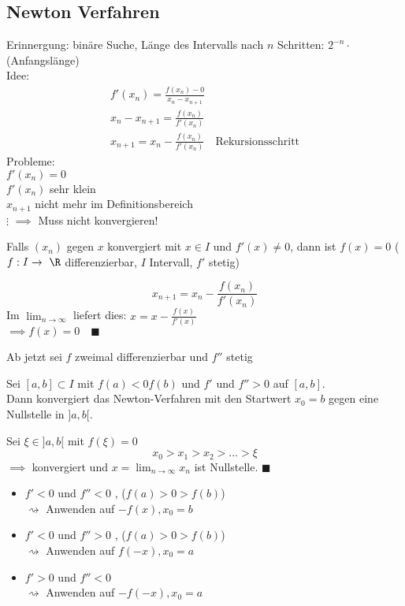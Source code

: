 \subsection{Newton Verfahren}
Erinnergung: binäre Suche, Länge des Intervalls nach $n$ Schritten: $2^{-n} \cdot$ (Anfangslänge)\\
Idee:
\begin{gather*}
	f'(x_n) = \frac{f(x_n) - 0}{x_n - x_{n+1}} \\
	x_n - x_{n+1} = \frac{f(x_n)}{f'(x_n)} \\
	x_{n+1} = x_n - \frac{f(x_n)}{f'(x_n)} \quad \text{Rekursionsschritt}
\end{gather*}
Probleme: \\
$f'(x_n) = 0$ \\
$f'(x_n)$ sehr klein \\
$x_{n+1}$ nicht mehr im Definitionsbereich \\
$\vdots$
$\implies$ Muss nicht konvergieren! \\
\begin{beh}
	Falls $(x_n)$ gegen $x$ konvergiert mit $x \in I$ und $f'(x) \neq 0$, dann ist $f(x) = 0$ ($f: I \rightarrow \R$ differenzierbar, $I$ Intervall, $f'$ stetig) \\
	\begin{bew}
		\[ x_{n+1} = x_n - \frac{f(x_n)}{f'(x_n)} \]
		Im $\lim_{n \rightarrow \infty}$ liefert dies: $x = x - \frac{f(x)}{f'(x)}$ \\
		$\implies f(x) = 0 \quad \blacksquare$
	\end{bew}
\end{beh}
Ab jetzt sei $f$ zweimal differenzierbar und $f''$ stetig \\
\begin{beh}
	Sei $[a,b] \subset I$ mit $f(a) < 0 f(b)$ und $f'$ und $f'' > 0$ auf $[a,b]$. \\
	Dann konvergiert das Newton-Verfahren mit den Startwert $x_0 = b$ gegen eine Nullstelle in $]a,b[$. \\
	\begin{bew}
		Sei $\xi \in ]a,b[$ mit $f(\xi) = 0$
		\[ x_0 > x_1 > x_2 > \dots > \xi \]
		$\implies$ konvergiert und $x = \lim_{n \rightarrow \infty} x_n$ ist Nullstelle. \quad $\blacksquare$
	\end{bew}
\end{beh}
\begin{itemize}
	\item $f' < 0$ und $f'' < 0$ , ($f(a) > 0 > f(b)$) \\
		$\rightsquigarrow$ Anwenden auf $-f(x) , x_0 = b$
	\item $f' < 0$ und $f'' > 0$ , ($f(a) > 0 > f(b)$) \\
		$\rightsquigarrow$ Anwenden auf $f(-x) , x_0 = a$
	\item $f' > 0$ und $f'' < 0$ \\
		$\rightsquigarrow$ Anwenden auf $-f(-x) , x_0 = a$
\end{itemize}

